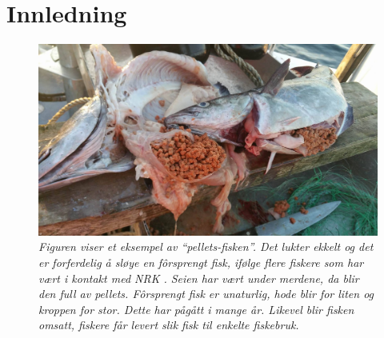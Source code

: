 \section{Innledning}




\begin{figure} 
\begin{center} 
\includegraphics[scale=0.2]{figures/oppdrettfor}
\caption{\small \sl Figuren viser et eksempel av ``pellets-fisken''. Det lukter ekkelt og det er forferdelig å sløye en fôrsprengt fisk, ifølge flere fiskere som har vært i kontakt med NRK \cite{Trana m.fl. 2019}. Seien har vært under merdene, da blir den full av pellets. Fôrsprengt fisk er unaturlig, hode blir for liten og kroppen for stor. Dette har pågått i mange år. Likevel blir fisken omsatt, fiskere får levert slik fisk til enkelte fiskebruk. \cite{Angell og Ekanger 2017} \label{fig:forsprengt}} 
\end{center} 
\end{figure} 

